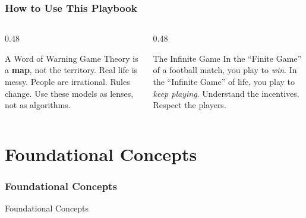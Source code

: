 \begin{frame}[fragile]\frametitle{How to Use This Playbook}
  \begin{columns}
    \begin{column}[T]{0.48\linewidth}
      \begin{block}{A Word of Warning}
        Game Theory is a \textbf{map}, not the territory.
        Real life is messy. People are irrational. Rules change.
        Use these models as lenses, not as algorithms.
      \end{block}
    \end{column}
    \begin{column}[T]{0.48\linewidth}
      \begin{alertblock}{The Infinite Game}
        In the ``Finite Game'' of a football match, you play to \textit{win}.
        In the ``Infinite Game'' of life, you play to \textit{keep playing}.
        Understand the incentives. Respect the players.
      \end{alertblock}
    \end{column}
  \end{columns}
\end{frame}

\section{Foundational Concepts}

\begin{frame}[fragile]\frametitle{Foundational Concepts}
\begin{center}
{\Large Foundational Concepts}
\end{center}
\end{frame}

